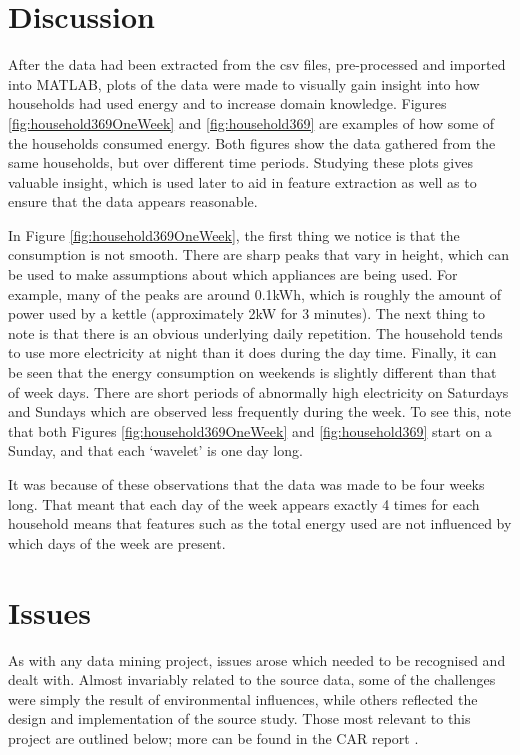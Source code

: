 \section{Discussion}

After the data had been extracted from the csv files, pre-processed and imported into MATLAB, plots of the data were made to visually gain insight into how households had used energy and to increase domain knowledge. Figures \ref{fig:household369OneWeek} and \ref{fig:household369} are examples of how some of the households consumed energy. Both figures show the data gathered from the same households, but over different time periods. Studying these plots gives valuable insight, which is used later to aid in feature extraction as well as to ensure that the data appears reasonable. 

In Figure \ref{fig:household369OneWeek}, the first thing we notice is that the consumption is not smooth. There are sharp peaks that vary in height, which can be used to make assumptions about which appliances are being used. For example, many of the peaks are around 0.1kWh, which is roughly the amount of power used by a kettle (approximately 2kW for 3 minutes). The next thing to note is that there is an obvious underlying daily repetition. The household tends to use more electricity at night than it does during the day time. Finally, it can be seen that the energy consumption on weekends is slightly different than that of week days. There are short periods of abnormally high electricity on Saturdays and Sundays which are observed less frequently during the week. To see this, note that both Figures \ref{fig:household369OneWeek} and \ref{fig:household369} start on a Sunday, and that each `wavelet' is one day long.

It was because of these observations that the data was made to be four weeks long. That meant that each day of the week appears exactly 4 times for each household means that features such as the total energy used are not influenced by which days of the week are present.

\householdOneWeek
\householdPlot




\section{Issues}

As with any data mining project, issues arose which needed to be recognised and dealt with.  Almost invariably related to the source data, some of the challenges were simply the result of environmental influences, while others reflected the design and implementation of the source study.  Those most relevant to this project are outlined below; more can be found in the CAR report \cite{early_findings}.

